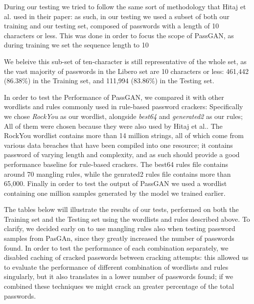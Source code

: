 During our testing we tried to follow the same sort of methodology that Hitaj et al.\cite{PassGAN} used in their paper: as such, in our testing we used a subset of both our training  and our testing set, composed of passwords with a length of 10 characters or less. This was done in order to focus the scope of PassGAN, as during training we set the sequence length to 10 %

We beleive this sub-set of ten-character is still representative of the whole set, as the vast majority of passwords in the Libero set are 10 characters or less: 461,442 (86.38\%) in the Training set, and 111,994 (83.86\%) in the Testing set. 

In order to test the Performance of PassGAN, we compared it with other wordlists and rules commonly used in rule-based password crackers: Specifically we chose \emph{RockYou} as our wordlist, alongside \emph{best64} and \emph{generated2} as our rules; All of them were chosen because they were also used by Hitaj et al.\cite{PassGAN}.
The RockYou wordlist contains more than 14 million strings, all of which come from various data breaches that have been compiled into one resource; it contains password of varying length and complexity, and as such should provide a good performance baseline for rule-based crackers. The best64 rules file contains around 70 mangling rules, while the genrated2 rules file contains more than 65,000. 
Finally in order to test the output of PassGAN we used a wordlist containing one million samples generated by the model we trained earlier.

The tables below will illustrate the results of our tests, performed on both the Training set and the Testing set using the wordlists and rules described above. To clarify, we decided early on to use mangling rules also when testing password samples from PasGAn, since they greatly increased the number of passwords found. In order to test the performance of each combination separately, we disabled caching of cracked passwords between cracking attempts: this allowed us to evaluate the performance of different combination of wordlists and rules singularly, but it also translates in a lower number of passwords found; if we combined these techniques we might crack an greater percentage of the total passwords.

